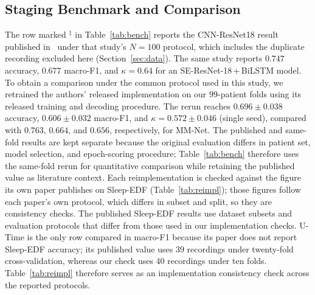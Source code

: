 \documentclass{ieeeaccess}
\newcommand{\mmAcc}{0.763}
\newcommand{\mmMf}{0.664}
\newcommand{\mmK}{0.656}
\begin{document}
\subsection{Staging Benchmark and Comparison}
The row marked $^{\ddagger}$ in Table~\ref{tab:bench} reports the CNN-ResNet18 result published
in~\cite{bose2026gap} under that study's $N=100$ protocol, which includes the
duplicate recording excluded here (Section~\ref{sec:data}). The same study reports
$0.747$ accuracy, $0.677$ macro-F1, and $\kappa=0.64$ for an
SE-ResNet-18\,+\,BiLSTM model. To obtain a comparison under the common protocol used
in this study, we retrained the authors' released implementation on our $99$-patient
folds using its released training and decoding procedure. The rerun reaches
$0.696 \pm 0.038$ accuracy, $0.606 \pm 0.032$ macro-F1, and
$\kappa=0.572 \pm 0.046$ (single seed), compared with $\mmAcc$, $\mmMf$, and
$\mmK$, respectively, for MM-Net. The published and same-fold results are kept
separate because the original evaluation differs in patient set, model selection,
and epoch-scoring procedure; Table~\ref{tab:bench} therefore uses the same-fold
rerun for quantitative comparison while retaining the published value as
literature context. Each reimplementation is checked against the figure its own paper
publishes on Sleep-EDF (Table~\ref{tab:reimpl}); those figures follow each paper's own protocol, which
differs in subset and split, so they are consistency checks.
The published Sleep-EDF results use dataset subsets and evaluation protocols that
differ from those used in our implementation checks. U-Time is the only row compared
in macro-F1 because its paper does not report Sleep-EDF accuracy; its published value
uses $39$ recordings under twenty-fold cross-validation, whereas our check uses
$40$ recordings under ten folds. Table~\ref{tab:reimpl} therefore serves as an
implementation consistency check across the reported protocols.
\end{document}
